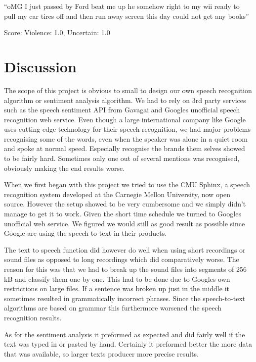 \documentclass[a4paper,12pt,twoside]{ltxdoc}
\begin{document}
\begin{center}
``oMG I just passed by Ford beat me up he somehow right to my wii ready to pull my car tires off and then run away screen this day could not get any books''
\end{center}
\hfill Score: Violence: 1.0, Uncertain: 1.0

\section{Discussion}
The scope of this project is obvious to small to design our own speech recognition algorithm or sentiment analysis algorithm. We had to rely on 3rd party services such as the speech sentiment API from Gavagai and Googles unofficial speech recognition web service. Even though a large international company like Google uses cutting edge technology for their speech recognition, we had major problems recognising some of the words, even when the speaker was alone in a quiet room and spoke at normal speed. Especially recognise the brands them selves showed to be fairly hard. Sometimes only one out of several mentions was recognised, obviously making the end results worse. 

When we first began with this project we tried to use the CMU Sphinx, a speech recognition system developed at the Carnegie Mellon University, now open source. However the setup showed to be very cumbersome and we simply didn't manage to get it to work. Given the short time schedule we turned to Googles unofficial web service. We figured we would still as good result as possible since Google are using the speech-to-text in their products. 

The text to speech function did however do well when using short recordings or sound files as opposed to long recordings which did comparatively worse. The reason for this was that we had to break up the sound files into segments of 256 kB and classify them one by one. This had to be done due to Googles own restrictions on large files. If a sentence was broken up just in the middle it sometimes resulted in grammatically incorrect phrases. Since the speech-to-text algorithms are based on grammar this furthermore worsened the speech recognition results.

As for the sentiment analysis it preformed as expected and did fairly well if the text was typed in or pasted by hand. Certainly it preformed better the more data that was available, so larger texts producer more precise results. 
\end{document}
